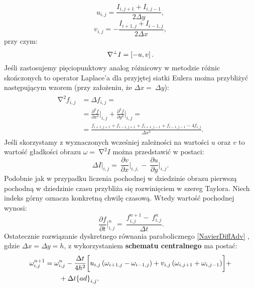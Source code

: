 \documentclass[a4paper,12pt,twoside,openany]{report}
\begin{document}
\begin{equation}
u_{i,j}=\frac{I_{i,j+1}+I_{i,j-1}}{2\Delta y} 
\label{u}
,
\end{equation}
\begin{equation}
 v_{i,j}=-\frac{I_{i+1,j}+I_{i-1,j}}{2\Delta x}
\label{v}
,
\end{equation}
przy czym:
\begin{equation}\\
{\mathrm{\nabla }}^{\bot }I=\left[-u,v\right]
\label{gradI}
.
\end{equation}
Jeśli zastosujemy pięciopunktowy analog różnicowy \cite{blacksuccessive} w metodzie różnic skończonych to operator Laplace’a dla przyjętej siatki Eulera można przybliżyć następującym wzorem (przy założeniu, że $\Delta x=\ \Delta y$):
\begin{align}
\begin{aligned}
{\mathrm{\nabla }}^2f_{i,j} &= \Delta f_{i,j}=\\[1ex]
&={\frac{{\partial }^2f}{\partial x^2}}\bigg|_{i,j}+{\frac{{\partial }^2f}{\partial y^2}}\bigg|_{i,j}=\\
&=\frac{f_{i+1,j+1}+f_{i-1,j+1}+f_{i+1,j-1}+f_{i-1,j-1}-4f_{i,j}}{\Delta x^2} .
\end{aligned}
\label{LaplaceOpr}
\end{align}
Jeśli skorzystamy z wyznaczonych wcześniej zależności na wartości $u$ oraz $v$ to wartość gładkości obrazu $\omega =\ {\mathrm{\nabla }}^2I$ można przedstawić w postaci: 
\begin{equation}
\Delta {I}\big|_{i,j}=\ {\frac{\partial v}{\partial x}}\bigg|_{i,j,}-\ {\frac{\partial u}{\partial y}}\bigg|_{i,j}
\label{discreteVorticity}
.
\end{equation}
Podobnie jak w przypadku liczenia pochodnej w dziedzinie obrazu pierwszą pochodną w dziedzinie czasu przybliża się rozwinięciem w szereg Taylora. Niech indeks górny oznacza konkretną chwilę czasową. Wtedy wartość pochodnej wynosi:
\begin{equation}
\ {{\frac{\partial f}{\partial t}}\bigg|^n_{i,j}=\ \frac{f^{n+1}_{i,j}-\ f^n_{i,j}}{\Delta t}}
\label{dfdt}
.
\end{equation}
Ostatecznie rozwiązanie dyskretnego równania parabolicznego \eqref{NavierDiffAdv} , gdzie $\Delta x= \Delta y=h$, z wykorzystaniem \textbf{schematu centralnego} ma postać:
\begin{align}
\omega ^{n+1}_{i,j} &= {\omega }^n_{i,j} - \frac{\Delta t}{4h^2}\biggl[u_{i,j} \left({\omega }_{i+1,j}
-{\omega }_{i-1,j}\right)+ v_{i,j} \left({\omega }_{i,j+1}+{\omega }_{i,j-1}\right)\biggr]+\notag\\ 
&\qquad + \Delta t{\left\{ad\right\}}_{i,j}.
\label{NavierDiffAdvCen}
\end{align}
\end{document}
